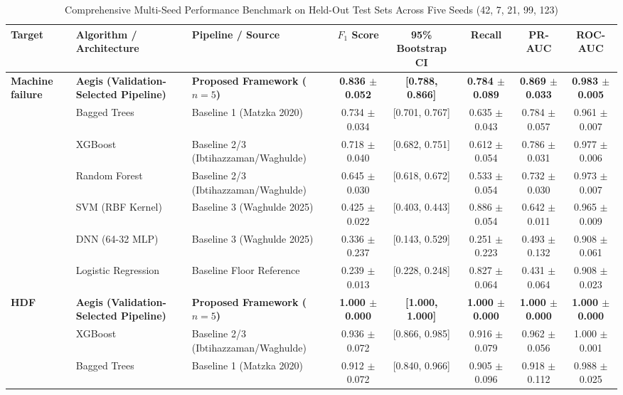 \documentclass[conference]{IEEEtran}
\begin{document}
\begin{table}[t]
\caption{Comprehensive Multi-Seed Performance Benchmark on Held-Out Test Sets Across Five Seeds (42, 7, 21, 99, 123)}
\centering
\begin{tabular}{lllccccc}
\toprule
\textbf{Target} & \textbf{Algorithm / Architecture} & \textbf{Pipeline / Source} & \textbf{$F_1$ Score} & \textbf{95\% Bootstrap CI} & \textbf{Recall} & \textbf{PR-AUC} & \textbf{ROC-AUC} \\
\midrule
\multirow{7}{*}{\textbf{Machine failure}} & \textbf{Aegis (Validation-Selected Pipeline)} & \textbf{Proposed Framework ($n=5$)} & \textbf{0.836 $\pm$ 0.052} & \textbf{[0.788, 0.866]} & \textbf{0.784 $\pm$ 0.089} & \textbf{0.869 $\pm$ 0.033} & \textbf{0.983 $\pm$ 0.005} \\
 & Bagged Trees & Baseline 1 (Matzka 2020) & 0.734 $\pm$ 0.034 & [0.701, 0.767] & 0.635 $\pm$ 0.043 & 0.784 $\pm$ 0.057 & 0.961 $\pm$ 0.007 \\
 & XGBoost & Baseline 2/3 (Ibtihazzaman/Waghulde) & 0.718 $\pm$ 0.040 & [0.682, 0.751] & 0.612 $\pm$ 0.054 & 0.786 $\pm$ 0.031 & 0.977 $\pm$ 0.006 \\
 & Random Forest & Baseline 2/3 (Ibtihazzaman/Waghulde) & 0.645 $\pm$ 0.030 & [0.618, 0.672] & 0.533 $\pm$ 0.054 & 0.732 $\pm$ 0.030 & 0.973 $\pm$ 0.007 \\
 & SVM (RBF Kernel) & Baseline 3 (Waghulde 2025) & 0.425 $\pm$ 0.022 & [0.403, 0.443] & 0.886 $\pm$ 0.054 & 0.642 $\pm$ 0.011 & 0.965 $\pm$ 0.009 \\
 & DNN (64-32 MLP) & Baseline 3 (Waghulde 2025) & 0.336 $\pm$ 0.237 & [0.143, 0.529] & 0.251 $\pm$ 0.223 & 0.493 $\pm$ 0.132 & 0.908 $\pm$ 0.061 \\
 & Logistic Regression & Baseline Floor Reference & 0.239 $\pm$ 0.013 & [0.228, 0.248] & 0.827 $\pm$ 0.064 & 0.431 $\pm$ 0.064 & 0.908 $\pm$ 0.023 \\
\midrule
\multirow{3}{*}{\textbf{HDF}} & \textbf{Aegis (Validation-Selected Pipeline)} & \textbf{Proposed Framework ($n=5$)} & \textbf{1.000 $\pm$ 0.000} & \textbf{[1.000, 1.000]} & \textbf{1.000 $\pm$ 0.000} & \textbf{1.000 $\pm$ 0.000} & \textbf{1.000 $\pm$ 0.000} \\
 & XGBoost & Baseline 2/3 (Ibtihazzaman/Waghulde) & 0.936 $\pm$ 0.072 & [0.866, 0.985] & 0.916 $\pm$ 0.079 & 0.962 $\pm$ 0.056 & 1.000 $\pm$ 0.001 \\
 & Bagged Trees & Baseline 1 (Matzka 2020) & 0.912 $\pm$ 0.072 & [0.840, 0.966] & 0.905 $\pm$ 0.096 & 0.918 $\pm$ 0.112 & 0.988 $\pm$ 0.025 \\

\end{tabular}
\end{table}
\end{document}
